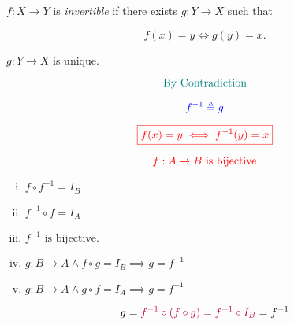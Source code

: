\begin{frame}{}
  \begin{definition}[Invertible]
    $f: X \to Y$ is {\it invertible} if there exists $g: Y \to X$ such that

    \[
      f(x) = y \iff g(y) = x.
    \]
  \end{definition}

  \pause
  \vspace{0.30cm}
  \begin{theorem}
    $g: Y \to X$ is unique.
  \end{theorem}

  \pause
  \[
    \text{\textcolor{teal}{By Contradiction}}
  \]

  \pause
  \[
    \textcolor{blue}{f^{-1} \triangleq g}
  \]

  \pause
  \[
    \textcolor{red}{\boxed{f(x) = y \iff f^{-1}(y) = x}}
  \]
\end{frame}

\begin{frame}{}
  \begin{theorem}[]
    \[
      \textcolor{red}{f: A \to B \text{ is bijective}}
    \]

    \begin{enumerate}[(i)]
      \item $f \circ f^{-1} = I_B$
      \item $f^{-1} \circ f = I_A$
      \vspace{0.30cm}
      \item $f^{-1} \text{ is bijective}.$
      \vspace{0.30cm}
      \item $g: B \to A \land f \circ g = I_B \implies g = f^{-1}$
      \item $g: B \to A \land g \circ f = I_A \implies g = f^{-1}$
    \end{enumerate}
  \end{theorem}

  \pause
  \begin{center}
  \end{center}

  \pause
  \vspace{-0.30cm}
  \[
    g = \textcolor{purple}{f^{-1} \circ (f \circ g) = f^{-1} \circ I_B} = f^{-1}
  \]
\end{frame}


